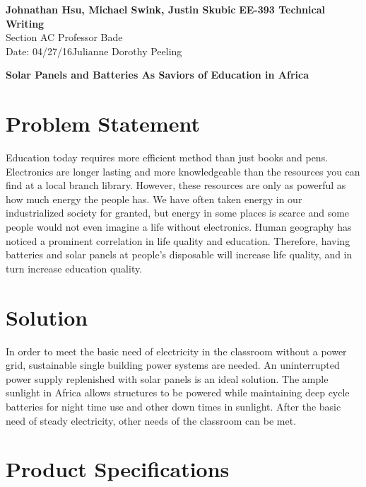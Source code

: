 \documentclass[letter, 11pt]{article}
\begin{document}
\noindent
\large\textbf{Johnathan Hsu, Michael Swink, Justin Skubic} \hfill \textbf{EE-393 Technical Writing} \\
\normalsize Section AC \hfill Professor Bade\\
Date: 04/27/16\hfill Julianne Dorothy Peeling\\

\begin{center}
      \Large\textbf{Solar Panels and Batteries As Saviors of Education in Africa}\\
\end{center}


\section*{Problem Statement}
	Education today requires more efficient method than just books and pens. Electronics are longer lasting and more knowledgeable than the resources you can find at a local branch library. However, these resources are only as powerful as how much energy the people has. We have often taken energy in our industrialized society for granted, but energy in some places is scarce and some people would not even imagine a life without electronics. Human geography has noticed a prominent correlation in life quality and education. Therefore, having batteries and solar panels at people’s disposable will increase life quality, and in turn increase education quality.

\section*{Solution}

In order to meet the basic need of electricity in the classroom without a power grid, sustainable single building power systems are needed. An uninterrupted power supply replenished with solar panels is an ideal solution. The ample sunlight in Africa allows structures to be powered while maintaining deep cycle batteries for night time use and other down times in sunlight. After the basic need of steady electricity, other needs of the classroom can be met.


\section*{Product Specifications}
\end{document}
